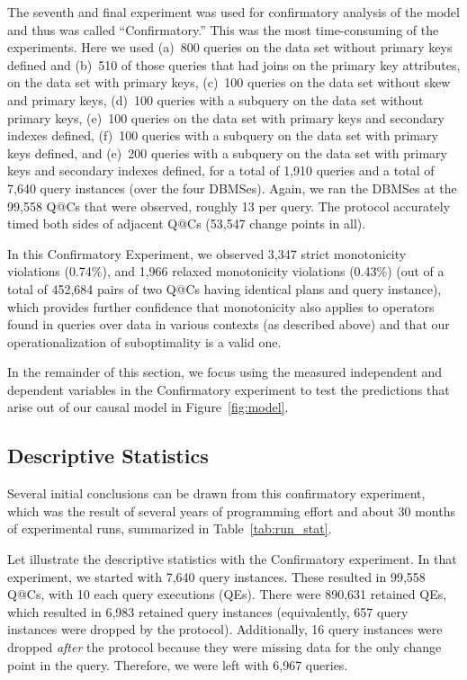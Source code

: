 \documentclass[prodmode,acmtods]{acmsmall}
\makeatletter
\def\QatC{Q{@}C}
\makeatother
\begin{document}
The seventh and final experiment was used for confirmatory analysis of the model and thus was
called ``Confirmatory.'' This was the most time-consuming of
the experiments. Here we
used (a)~800 queries on the data set without primary keys defined and (b)~510 of
those queries that had joins on the primary key attributes, on the data set
with primary keys, 
(c)~100 queries on the data set without skew and primary keys,  
(d)~100 queries with a subquery on the data set without primary keys,  
(e)~100 queries on the data set with primary keys and secondary indexes defined, 
(f)~100 queries with a subquery on the data set with primary keys defined, and 
(e)~200 queries with a subquery on the data set with primary keys and secondary indexes defined,
for a total of 1,910 queries and a total of 7,640 query instances (over the
four \hbox{DBMSes}).
Again, we ran the \hbox{DBMSes} at the 99,558 {\QatC}s that were observed,
roughly 13 per query. The protocol accurately timed
both sides of adjacent {\QatC}s (53,547 change points in all).

In this Confirmatory Experiment, we observed 3,347 strict monotonicity
violations (0.74\%), and 1,966 relaxed monotonicity violations (0.43\%) (out
of a total of 452,684 pairs
of two Q@Cs having identical plans and query instance), which provides
further confidence that monotonicity also applies to operators found in
queries over data in various contexts (as described above) and that our
operationalization of suboptimality is a valid one.

In the remainder of this section, we focus using the measured independent
and dependent variables in the Confirmatory experiment
to test the predictions that arise out of our causal model in Figure~\ref{fig:model}.

\subsection{Descriptive Statistics}
Several initial conclusions can be drawn from this confirmatory experiment, which was the
result of several years of programming effort and about 30 months of
experimental runs, summarized in Table~\ref{tab:run_stat}. 

Let illustrate the descriptive statistics with the Confirmatory
experiment. In that experiment, we started with 7,640 query instances. These
resulted in 99,558 Q@Cs, with 10 each query executions (QEs). There were 890,631
retained QEs, which resulted in 6,983 retained query
instances (equivalently, 657 query instances were dropped by the
protocol). Additionally, 16 query instances were dropped {\em after} the
protocol because they were missing data for the only change point in the
query. Therefore, we were left with 6,967 queries.
\end{document}
